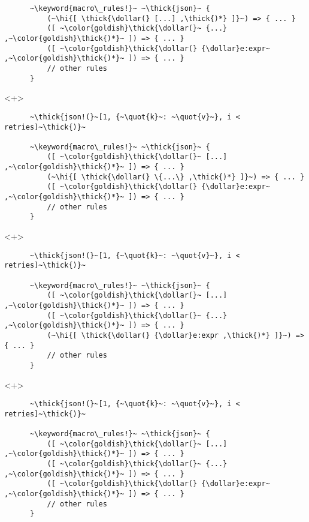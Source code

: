 \documentclass[usepdftitle=false,aspectratio=169]{beamer}
\newcommand{\dollar}{\makebox[\widthof{\$}][c]{\$}}
\newcommand{\thick}[1]{\contourlength{0.16pt}\contour[10]{black}{#1}}
\newcommand{\slantbox}[2][.5]
  {%
    \mbox
      {%
        \sbox{\foobox}{#2}%
        \hskip\wd\foobox
        \pdfsave
        \pdfsetmatrix{1 0 #1 1}%
        \llap{\usebox{\foobox}}%
        \pdfrestore
      }%
  }
\newcommand{\backslantbox}[2][.5]
  {%
    \mbox
      {%
        \sbox{\foobox}{#2}%
        \hskip\wd\foobox
        \pdfsave
        \pdfsetmatrix{-1 0 #1 1}%
        \llap{\usebox{\foobox}}%
        \pdfrestore
      }%
  }
\newcommand{\hi}[1]{%
\tikz[baseline=(A.base)]
 \node[highlighting=yellowbg,inner sep=0pt,text depth=0pt] (A) {#1};%
}
\newcommand{\openquote}{\backslantbox[.2]{\hspace{11pt}''\hspace{-11pt}}}
\newcommand{\closequote}{\slantbox[-.2]{\hspace{2pt}''\hspace{-2pt}}}
\newcommand{\blackquote}[1]{\openquote#1\closequote}
\newcommand{\quot}[1]{{\color{redish}\blackquote{#1}}}
\newcommand{\keyword}[1]{\color{greenish}#1}
\begin{document}
\begin{frame}[fragile]
\begin{onlyenv}
\begin{verbatim}
      ~\keyword{macro\_rules!}~ ~\thick{json}~ {
          (~\hi{[ \thick{\dollar(} [...] ,\thick{)*} ]}~) => { ... }
          ([ ~\color{goldish}\thick{\dollar(}~ {...} ,~\color{goldish}\thick{)*}~ ]) => { ... }
          ([ ~\color{goldish}\thick{\dollar(} {\dollar}e:expr~ ,~\color{goldish}\thick{)*}~ ]) => { ... }
          // other rules
      }
    \end{verbatim}
  \end{onlyenv}
  \begin{onlyenv}<+>
    \begin{verbatim}
      ~\thick{json!(}~[1, {~\quot{k}~: ~\quot{v}~}, i < retries]~\thick{)}~

      ~\keyword{macro\_rules!}~ ~\thick{json}~ {
          ([ ~\color{goldish}\thick{\dollar(}~ [...] ,~\color{goldish}\thick{)*}~ ]) => { ... }
          (~\hi{[ \thick{\dollar(} \{...\} ,\thick{)*} ]}~) => { ... }
          ([ ~\color{goldish}\thick{\dollar(} {\dollar}e:expr~ ,~\color{goldish}\thick{)*}~ ]) => { ... }
          // other rules
      }
    \end{verbatim}
  \end{onlyenv}
  \begin{onlyenv}<+>
    \begin{verbatim}
      ~\thick{json!(}~[1, {~\quot{k}~: ~\quot{v}~}, i < retries]~\thick{)}~

      ~\keyword{macro\_rules!}~ ~\thick{json}~ {
          ([ ~\color{goldish}\thick{\dollar(}~ [...] ,~\color{goldish}\thick{)*}~ ]) => { ... }
          ([ ~\color{goldish}\thick{\dollar(}~ {...} ,~\color{goldish}\thick{)*}~ ]) => { ... }
          (~\hi{[ \thick{\dollar(} {\dollar}e:expr ,\thick{)*} ]}~) => { ... }
          // other rules
      }
    \end{verbatim}
  \end{onlyenv}
  \begin{onlyenv}<+>
    \begin{verbatim}
      ~\thick{json!(}~[1, {~\quot{k}~: ~\quot{v}~}, i < retries]~\thick{)}~

      ~\keyword{macro\_rules!}~ ~\thick{json}~ {
          ([ ~\color{goldish}\thick{\dollar(}~ [...] ,~\color{goldish}\thick{)*}~ ]) => { ... }
          ([ ~\color{goldish}\thick{\dollar(}~ {...} ,~\color{goldish}\thick{)*}~ ]) => { ... }
          ([ ~\color{goldish}\thick{\dollar(} {\dollar}e:expr~ ,~\color{goldish}\thick{)*}~ ]) => { ... }
          // other rules
      }
    \end{verbatim}
  \end{onlyenv}
\end{frame}
\end{document}
